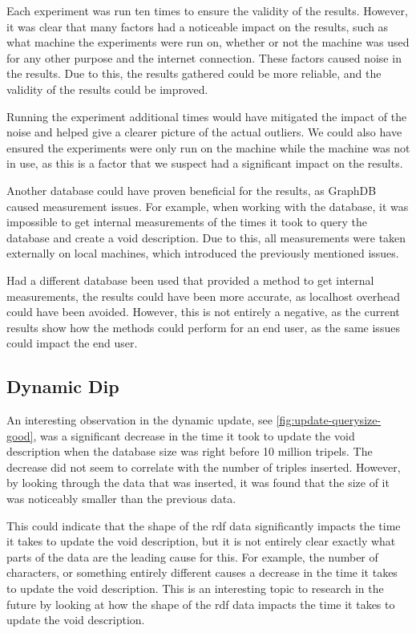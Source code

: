 Each experiment was run ten times to ensure the validity of the results. However, it was clear that many factors had a noticeable impact on the results, such as what machine the experiments were run on, whether or not the machine was used for any other purpose and the internet connection. These factors caused noise in the results. Due to this, the results gathered could be more reliable, and the validity of the results could be improved.

Running the experiment additional times would have mitigated the impact of the noise and helped give a clearer picture of the actual outliers. We could also have ensured the experiments were only run on the machine while the machine was not in use, as this is a factor that we suspect had a significant impact on the results.

Another database could have proven beneficial for the results, as GraphDB caused measurement issues. For example, when working with the database, it was impossible to get internal measurements of the times it took to query the database and create a \gls{void} description. Due to this, all measurements were taken externally on local machines, which introduced the previously mentioned issues.

Had a different database been used that provided a method to get internal measurements, the results could have been more accurate, as localhost overhead could have been avoided. However, this is not entirely a negative, as the current results show how the methods could perform for an end user, as the same issues could impact the end user.

\subsection{Dynamic Dip}\label{subsec:dynamic-dip}
An interesting observation in the dynamic update, see \autoref{fig:update-querysize-good}, was a significant decrease in the time it took to update the \gls{void} description when the database size was right before 10 million tripels. The decrease did not seem to correlate with the number of triples inserted. However, by looking through the data that was inserted, it was found that the size of it was noticeably smaller than the previous data.

This could indicate that the shape of the \gls{rdf} data significantly impacts the time it takes to update the \gls{void} description, but it is not entirely clear exactly what parts of the data are the leading cause for this. For example, the number of characters, or something entirely different causes a decrease in the time it takes to update the \gls{void} description. This is an interesting topic to research in the future by looking at how the shape of the \gls{rdf} data impacts the time it takes to update the \gls{void} description.

